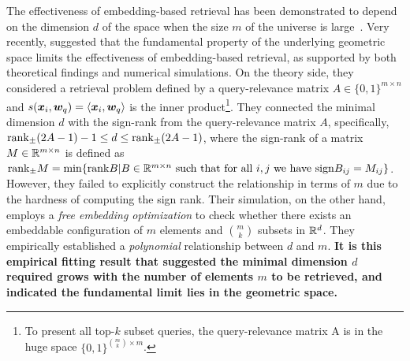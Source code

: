 \documentclass[10pt]{article}
\begin{document}
The effectiveness of embedding-based retrieval has been demonstrated to depend on the dimension $d$ of the space when the size $m$ of the universe is large~\cite{yin2018dimensionality,reimers2021curse}. Very recently, \cite{weller2025theoretical} suggested that the fundamental property of the underlying geometric space limits the effectiveness of embedding-based retrieval, as supported by both theoretical findings and numerical simulations. On the theory side, they considered a retrieval problem defined by a query-relevance matrix $A\in \{0, 1\}^{m\times n}$ and $s(\bm{x}_i, \bm{w}_q) = \langle \bm{x}_i, \bm{w}_q \rangle$ is the inner product\footnote{To present all top-$k$ subset queries, the query-relevance matrix A  is in the huge space $\{0,1\}^{\binom{m}{k} \times m}$.}. They connected the minimal dimension $d$ with the sign-rank from the query-relevance matrix $A$, specifically, ${\rm rank}_{\pm} (2A-1) - 1 \leq d \leq {\rm rank}_{\pm} (2A-1) $, where the sign-rank of a matrix $M\in \mathbb{R}^{m\times n}$ is defined as ${\rm rank}_{\pm} M = \min\{{\rm rank} B | B\in \mathbb{R}^{m\times n} \text{ such that for all } i, j \text{ we have } {\rm sign}B_{ij} = M_{ij}\}$. However, they failed to explicitly construct the relationship in terms of $m$ due to the hardness of computing the sign rank.
Their simulation, on the other hand, employs a \textit{free embedding optimization} to check whether there exists an embeddable configuration of $m$ elements and $\binom{m}{k}$ subsets in $\mathbb{R}^d$. They empirically established a \textit{polynomial} relationship between $d$ and $m$. \textbf{It is this empirical fitting result that suggested the minimal dimension $d$ required grows with the number of elements $m$ to be retrieved, and indicated the fundamental limit lies in the geometric space.}
\end{document}
